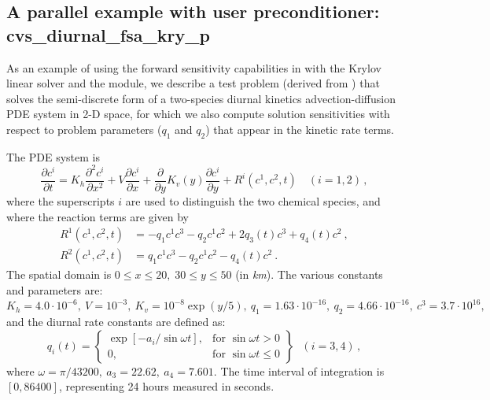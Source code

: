 


\subsection{A parallel example with user preconditioner: cvs\_diurnal\_fsa\_kry\_p}
\label{ss:cvs_diurnal_fsa_kry_p}

As an example of using the forward sensitivity capabilities in {\cvodes} 
with the Krylov linear solver {\sunlinsolspgmr} and the {\nvecp} module, we describe
a test problem (derived from ) that solves the
semi-discrete form of a two-species diurnal kinetics advection-diffusion PDE 
system in 2-D space, for which we also compute solution sensitivities with respect to 
problem parameters ($q_1$ and $q_2$) that appear in the kinetic rate terms.

The PDE system is
\begin{equation}\label{e:cvs_diurnal_fsa_kry_p_PDE}
  \frac{\partial c^i}{\partial t} = K_h\frac{\partial^2 c^i}{\partial x^2}
  +V \frac{\partial c^i}{\partial x}
  + \frac{\partial} {\partial y} K_v(y) \frac{\partial c^i}{\partial y}
  + R^i(c^1,c^2,t) \quad (i=1,2) \, ,
\end{equation}
where the superscripts $i$ are used to distinguish the two chemical
species, and where the reaction terms are given by
\begin{equation}\label{e:cvs_diurnal_fsa_kry_p_R}
  \begin{split}
    R^1(c^1,c^2,t) & = -q_1c^1c^3-q_2c^1c^2+2q_3(t)c^3+q_4(t)c^2 ~, \\
    R^2(c^1,c^2,t) & = q_1c^1c^3-q_2c^1c^2-q_4(t)c^2 ~.
  \end{split}
\end{equation}
The spatial domain is $0 \leq x \leq 20,\;30 \leq y \leq 50$ (in {\em km}). 
The various constants and parameters are: $K_h=4.0\cdot 10^{-6},
~ V=10^{-3},~ K_v=10^{-8}\exp (y/5),~ q_1=1.63\cdot 10^{-16},
~ q_2=4.66\cdot 10^{-16},~ c^3=3.7\cdot 10^{16},$ and the diurnal
rate constants are defined as:
\begin{equation*}
  q_i(t) = 
  \left\{ \begin{array}{ll}
      \exp [-a_i/\sin \omega t], & \mbox{for } \sin \omega t>0 \\
      0, & \mbox{for } \sin \omega t\leq 0
    \end{array} \right\} ~~~(i=3,4) \, ,
\end{equation*}
where $\omega =\pi /43200, ~ a_3=22.62,~ a_4=7.601.$  The time interval of
integration is $[0, 86400]$, representing 24 hours measured in seconds.

